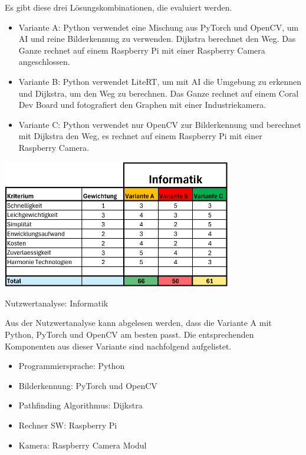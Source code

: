 Es gibt diese drei Lösungskombinationen, die evaluiert werden.

\begin{itemize}
     \item Variante A: Python verwendet eine Mischung aus PyTorch und OpenCV, um AI und reine Bilderkennung zu verwenden. Dijkstra berechnet den Weg. Das Ganze rechnet auf einem Raspberry Pi mit einer Raspberry Camera angeschlossen.
    \item  Variante B: Python verwendet LiteRT, um mit AI die Umgebung zu erkennen und Dijkstra, um den Weg zu berechnen. Das Ganze rechnet auf einem Coral Dev Board und fotografiert den Graphen mit einer Industriekamera.
    \item Variante C: Python verwendet nur OpenCV zur Bilderkennung und berechnet mit Dijkstra den Weg, es rechnet auf einem Raspberry Pi mit einer Raspberry Camera.
\end{itemize}

\begin{table}[H]
\centering
\includegraphics[width=0.75\textwidth]{assets/Nutzwertanalyse-I.pdf}
\caption{Nutzwertanalyse: Informatik}
\label{table:nutzwert-informatik}
\end{table}

Aus der Nutzwertanalyse kann abgelesen werden, dass die Variante A mit Python, PyTorch und OpenCV am besten passt. Die entsprechenden Komponenten aus dieser Variante sind nachfolgend aufgelistet.

\begin{itemize}
    \item Programmiersprache: Python
    \item Bilderkennung: PyTorch und OpenCV
    \item Pathfinding Algorithmus: Dijkstra
    \item Rechner SW: Raspberry Pi
    \item Kamera: Raspberry Camera Modul
\end{itemize}

